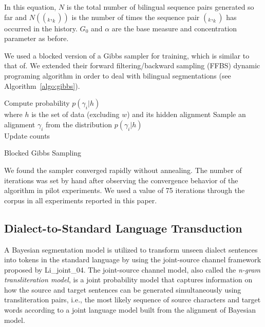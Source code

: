 \documentclass[english]{jnlp_1.4}
\newcommand{\phrase}[1]{}
\renewcommand{\shortcite}{}
\begin{document}
 In this equation, $N$ is the total number of bilingual sequence pairs generated so far
 and $N((\phrase{s}_k, \phrase{t}_k))$ is the number of times the sequence pair
 $(\phrase{s}_k, \phrase{t}_k)$ has occurred in the history.
 $G_0$ and $\alpha$ are the base measure and concentration parameter as before.

 We used a blocked version of a Gibbs sampler for training, which is similar
 to that of\linebreak \shortcite{mochihashi:09}. We extended their forward filtering/backward sampling (FFBS)
 dynamic programing algorithm in order to deal with bilingual segmentations (see Algorithm~\ref{algo:gibbs}). 

 \begin{algorithm}[t]
   \footnotesize
    {
    {
    {
            Compute probability
            $p({\gamma}_i | h )$ \\
            where $h$ is the set of data (excluding $w$) and its hidden alignment 
            }
    Sample an alignment $\gamma_i$ from the distribution $p({\gamma}_i | h )$ \\
    Update counts
    }
   }
   \caption{Blocked Gibbs Sampling} 
   \label{algo:gibbs} 
 \end{algorithm}

 We found the sampler converged rapidly without annealing. The number of iterations was set by
 hand after observing the convergence behavior of the algorithm in pilot experiments.
 We used a value of 75 iterations through the corpus in all experiments reported in this paper.



\subsection{Dialect-to-Standard Language Transduction}
\label{sec:dialect:transduct}

 A Bayesian segmentation model is utilized to transform unseen dialect sentences into tokens in 
 the standard language by using the joint-source channel framework proposed by \shortcite{Li_joint_04}.
 The joint-source channel model, also called the {\em n-gram transliteration model}, is a joint probability model
 that captures information on how the source and target sentences can be generated simultaneously
 using transliteration pairs, i.e., the most likely sequence of source characters and target words
 according to a joint language model built from the alignment of Bayesian model.
\end{document}
